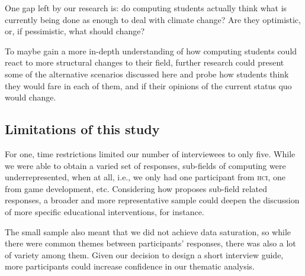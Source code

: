 One gap left by our research is: do computing students actually think what is currently being done as enough to deal with climate change? Are they optimistic, or, if pessimistic, what should change?

To maybe gain a more in-depth understanding of how computing students could react to more structural changes to their field, further research could present some of the alternative scenarios discussed here and probe how students think they would fare in each of them, and if their opinions of the current status quo would change.




\subsection{Limitations of this study}
For one, time restrictions limited our number of interviewees to only five. While we were able to obtain a varied set of responses, sub-fields of computing were underrepresented, when at all, i.e., we only had one participant from \textsc{hci}, one from game development, etc. Considering how \cite{easterbrook2010climate} proposes sub-field related responses, a broader and more representative sample could deepen the discussion of more specific educational interventions, for instance.

The small sample also meant that we did not achieve data saturation, so while there were common themes between participants' responses, there was also a lot of variety among them. Given our decision to design a short interview guide, more participants could increase confidence in our thematic analysis.


